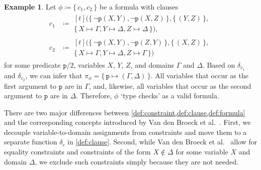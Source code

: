 \documentclass{article}
\theoremstyle{definition}
\newtheorem{example}{Example}
\begin{document}
\begin{example}\label{example:first}
  Let $\phi \coloneqq \{\, c_1, c_2 \,\}$ be a formula with clauses
  \begin{align*}
    c_1 &\coloneqq
          \begin{multlined}[t]
            (\{\, \neg \texttt{p}(X, Y), \neg \texttt{p}(X, Z) \,\}, \{\, (Y, Z) \,\}, \\
            \{\, X \mapsto \Gamma, Y \mapsto \Delta, Z \mapsto \Delta \,\}),
          \end{multlined}\\
    c_2 &\coloneqq
          \begin{multlined}[t]
            (\{\, \neg \texttt{p}(X, Y), \neg \texttt{p}(Z, Y) \,\}, \{\, (X, Z) \,\}, \\
            \{\, X \mapsto \Gamma, Y \mapsto \Delta, Z \mapsto \Gamma \,\})
          \end{multlined}
  \end{align*}
  for some predicate $\texttt{p}/2$, variables $X$, $Y$, $Z$, and domains
  $\Gamma$ and $\Delta$. Based on $\delta_{c_{1}}$ and $\delta_{c_{2}}$, we can
  infer that $\pi_{\phi} = \{\, \texttt{p} \mapsto (\Gamma, \Delta) \,\}$. All
  variables that occur as the first argument to $\texttt{p}$ are in $\Gamma$,
  and, likewise, all variables that occur as the second argument to $\texttt{p}$
  are in $\Delta$. Therefore, $\phi$ `type checks' as a valid formula.
\end{example}

There are two major differences between
\cref{def:constraint,def:clause,def:formula} and the corresponding concepts
introduced by Van den Broeck et al.~.
First, we decouple variable-to-domain assignments from constraints and move them
to a separate function $\delta_{c}$ in \cref{def:clause}. Second, while Van den
Broeck et al.~ allow for equality
constraints and constraints of the form $X \not\in \Delta$ for some variable $X$
and domain $\Delta$, we exclude such constraints simply because they are not
needed.
\end{document}
